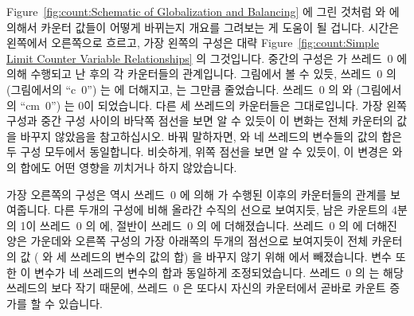 Figure~\ref{fig:count:Schematic of Globalization and Balancing} 에 그린 것처럼
 와  에 의해서 카운터 값들이 어떻게
바뀌는지 개요를 그려보는 게 도움이 될 겁니다.
시간은 왼쪽에서 오른쪽으로 흐르고, 가장 왼쪽의 구성은 대략
Figure~\ref{fig:count:Simple Limit Counter Variable Relationships} 의
그것입니다.
중간의 구성은  가 쓰레드~0 에 의해 수행되고 난 후의 각
카운터들의 관계입니다.
그림에서 볼 수 있듯, 쓰레드~0 의  (그림에서의 ``c~0'') 는
 에 더해지고,  는 그만큼 줄었습니다.
쓰레드~0 의  와  (그림에서의 ``cm~0'') 는 0이
되었습니다.
다른 세 쓰레드의 카운터들은 그대로입니다.
가장 왼쪽 구성과 중간 구성 사이의 바닥쪽 점선을 보면 알 수 있듯이 이 변화는
전체 카운터의 값을 바꾸지 않았음을 참고하십시오.
바꿔 말하자면,  와 네 쓰레드의  변수들의 값의 합은
두 구성 모두에서 동일합니다.
비슷하게, 위쪽 점선을 보면 알 수 있듯이, 이 변경은  와
 의 합에도 어떤 영향을 끼치거나 하지 않았습니다.

가장 오른쪽의 구성은 역시 쓰레드~0 에 의해  가 수행된
이후의 카운터들의 관계를 보여줍니다.
다른 두개의 구성에 비해 올라간 수직의 선으로 보여지듯, 남은 카운트의 4분의 1이
쓰레드~0 의  에, 절반이 쓰레드~0 의  에
더해졌습니다.
쓰레드~0 의  에 더해진 양은 가운데와 오른쪽 구성의 가장 아래쪽의
두개의 점선으로 보여지듯이 전체 카운터의 값 ( 와 세 쓰레드의
 변수의 값의 합) 을 바꾸지 않기 위해  에서
빼졌습니다.
 변수 또한 이 변수가 네 쓰레드의  변수의 합과
동일하게 조정되었습니다.
쓰레드~0 의  는 해당 쓰레드의  보다 작기 때문에,
쓰레드~0 은 또다시 자신의 카운터에서 곧바로 카운트 증가를 할 수 있습니다.
\iffalse

